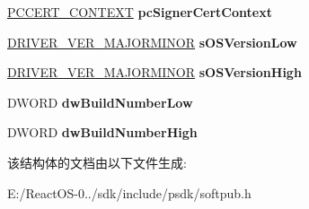 \begin{DoxyCompactItemize}
\item 
\mbox{\label{struct_d_r_i_v_e_r___v_e_r___i_n_f_o___a40afcf934e0b9662fc5b9283312abf45}} 
\hyperlink{struct___c_e_r_t___c_o_n_t_e_x_t}{P\+C\+C\+E\+R\+T\+\_\+\+C\+O\+N\+T\+E\+XT} {\bfseries pc\+Signer\+Cert\+Context}
\item 
\mbox{\label{struct_d_r_i_v_e_r___v_e_r___i_n_f_o___ad9441dfdc1219236c058e8348f804cf4}} 
\hyperlink{struct_d_r_i_v_e_r___v_e_r___m_a_j_o_r_m_i_n_o_r__}{D\+R\+I\+V\+E\+R\+\_\+\+V\+E\+R\+\_\+\+M\+A\+J\+O\+R\+M\+I\+N\+OR} {\bfseries s\+O\+S\+Version\+Low}
\item 
\mbox{\label{struct_d_r_i_v_e_r___v_e_r___i_n_f_o___a83336d71c5069dc4712e2ce7558b71dc}} 
\hyperlink{struct_d_r_i_v_e_r___v_e_r___m_a_j_o_r_m_i_n_o_r__}{D\+R\+I\+V\+E\+R\+\_\+\+V\+E\+R\+\_\+\+M\+A\+J\+O\+R\+M\+I\+N\+OR} {\bfseries s\+O\+S\+Version\+High}
\item 
\mbox{\label{struct_d_r_i_v_e_r___v_e_r___i_n_f_o___ab1b56c5b6d7c1b941f21af96b739582d}} 
D\+W\+O\+RD {\bfseries dw\+Build\+Number\+Low}
\item 
\mbox{\label{struct_d_r_i_v_e_r___v_e_r___i_n_f_o___a43cdd8e159dd9bc1638b9d6d68c05b5c}} 
D\+W\+O\+RD {\bfseries dw\+Build\+Number\+High}
\end{DoxyCompactItemize}


该结构体的文档由以下文件生成\+:\begin{DoxyCompactItemize}
\item 
E\+:/\+React\+O\+S-\/0../sdk/include/psdk/softpub.\+h\end{DoxyCompactItemize}
